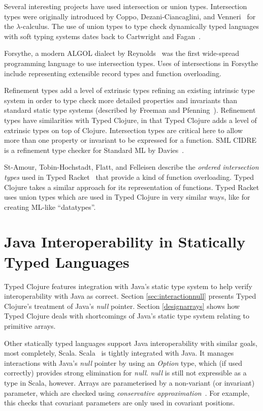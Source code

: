 Several interesting projects have used intersection or union types.
Intersection types were originally introduced by Coppo, Dezani-Ciancaglini, and Venneri~\cite{CDV81}
for the $\lambda$-calculus.
The use of union types to type check dynamically typed languages with soft typing systems
dates back to Cartwright and Fagan~\cite{CF91}.

Forsythe, a modern ALGOL dialect by Reynolds~\cite{Rey81,Rey96} was the first wide-spread 
programming language to use intersection types.
Uses of intersections in Forsythe include representing extensible record types
and function overloading.

Refinement types add a level of extrinsic types refining an existing intrinsic type system
in order to type check more detailed properties and invariants than standard static type systems
(described by Freeman and Pfenning~\cite{FP91}).
Refinement types have similarities with Typed Clojure, in that Typed Clojure
adds a level of extrinsic types on top of Clojure.
Intersection types are critical here to allow more than one property or invariant
to be expressed for a function.
SML CIDRE is a refinement type checker for Standard ML by Davies~\cite{Dav05}.

St-Amour, Tobin-Hochstadt, Flatt, and Felleisen
describe the \emph{ordered intersection types} used in Typed Racket~\cite{St12}
that provide a kind of function overloading.
Typed Clojure takes a similar approach for its representation of functions.
Typed Racket uses union types which are used in Typed Clojure in very similar ways,
like for creating ML-like ``datatypes''.

\section{Java Interoperability in Statically Typed Languages}

Typed Clojure features integration with Java's static type system
to help verify interoperability with Java as correct.
Section \ref{sec:interactionnull} presents Typed Clojure's treatment of
Java's \emph{null} pointer. 
Section \ref{designarrays} shows how Typed Clojure deals with shortcomings
of Java's static type system relating to primitive arrays.

Other statically typed languages support Java interoperability with
similar goals, most completely, Scala.
Scala~\cite{OCD+} is tightly integrated with Java. It manages interactions
with Java's \emph{null} pointer by using an \emph{Option} type, which (if
used correctly) provides strong elimination for \emph{null}.
\emph{null} is still not expressible as a type in Scala, however.
Arrays are parameterised by a non-variant (or invariant) parameter,
which are checked using \emph{conservative approximation}~\cite{OSV08}. For example,
this checks that covariant parameters are only used in covariant positions.

